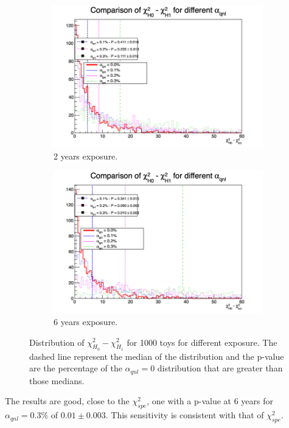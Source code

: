 \documentclass[../main.tex]{subfiles}
\begin{document}
\begin{figure}[th]
  \begin{subfigure}[t]{0.48\linewidth}
    \includegraphics[width=\linewidth]{images/joint_fit/stat_tests/chi2_H_2y.png}
    \caption{2 years exposure.}
  \end{subfigure}
  \begin{subfigure}[t]{0.48\linewidth}
    \includegraphics[width=\linewidth]{images/joint_fit/stat_tests/chi2_H_6y.png}
    \caption{6 years exposure.}
  \end{subfigure}
  \caption{Distribution of $\chi^2_{H_0} - \chi^2_{H_1}$ for 1000 toys for different exposure. The dashed line represent the median of the distribution and the p-value are the percentage of the $\alpha_{qnl} = 0$ distribution that are greater than those medians.}
  \label{fig:joint_fit:chi2_H}
\end{figure}

The results are good, close to the $\chi^2_{spe}$, one with a p-value at 6 years for $\alpha_{qnl} = 0.3\%$ of $0.01 \pm 0.003$. This sensitivity is consistent with that of $\chi^2_{spe}$.
\end{document}
